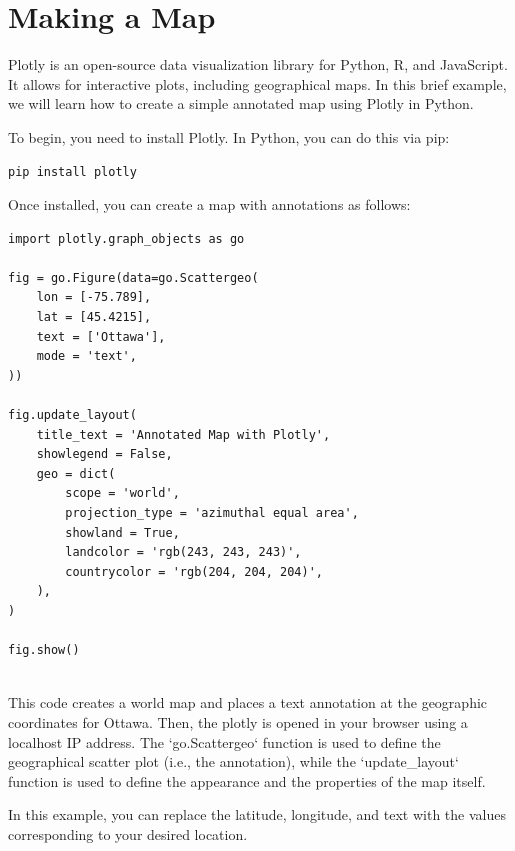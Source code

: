 \chapter{Making a Map}


Plotly is an open-source data visualization library for Python, R, and
JavaScript. It allows for interactive plots, including geographical
maps. In this brief example, we will learn how to create a simple
annotated map using Plotly in Python.

To begin, you need to install Plotly. In Python, you can do this via pip:

\begin{verbatim}
pip install plotly
\end{verbatim}

Once installed, you can create a map with annotations as follows:


\begin{verbatim}
import plotly.graph_objects as go

fig = go.Figure(data=go.Scattergeo(
    lon = [-75.789], 
    lat = [45.4215],
    text = ['Ottawa'],
    mode = 'text',
))

fig.update_layout(
    title_text = 'Annotated Map with Plotly',
    showlegend = False,
    geo = dict(
        scope = 'world',
        projection_type = 'azimuthal equal area',
        showland = True,
        landcolor = 'rgb(243, 243, 243)',
        countrycolor = 'rgb(204, 204, 204)',
    ),
)

fig.show()


\end{verbatim}
This code creates a world map and places a text annotation at the
geographic coordinates for Ottawa. Then, the plotly is opened in your browser using a localhost IP address. 
The `go.Scattergeo` function is
used to define the geographical scatter plot (i.e., the annotation),
while the `update\_layout` function is used to define the appearance
and the properties of the map itself.

In this example, you can replace the latitude, longitude, and text
with the values corresponding to your desired location.
